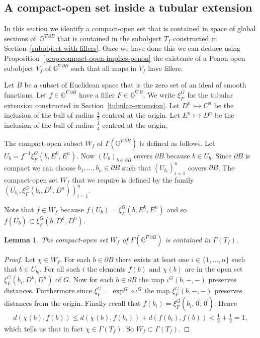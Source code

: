 \documentclass[pdftex]{sigma}
\numberwithin{equation}{section}
\newtheorem{Lemma}[Theorem]{Lemma}
\begin{document}
\subsection{A compact-open set inside a tubular extension}\label{sec:compact-open-in-tubular}

In this section we identify a compact-open set that is contained in space of global sections of~$\mathbb{G}^{\nabla\partial B}$ that is contained in the subobject $T_f$ constructed in Section~\ref{subobject-with-fillers}. Once we have done this we can deduce using Proposition~\ref{prop:compact-open-implies-penon} the existence of a Penon open subobject $V_f$ of $\mathbb{G}^{\nabla\partial B}$ such that all maps in $V_f$ have f\/illers.

\begin{Notation} Let $B$ be a subset of Euclidean space that is the zero set of an ideal of smooth functions. Let $f\in \mathbb{G}^{\nabla\partial B}$ have a f\/iller $F\in \mathbb{G}^{\nabla B}$. We write $\xi^G_F$ for the tubular extension constructed in Section~\ref{tubular-extension}. Let $D^n \rightarrowtail C^n$ be the inclusion of the ball of radius $\frac{1}{2}$ centred at the origin. Let $E^n \rightarrowtail D^n$ be the inclusion of the ball of radius $\frac{1}{4}$ centred at the origin,
\end{Notation}

\begin{Definition}The compact-open subset $W_f$ of $\Gamma(\mathbb{G}^{\nabla\partial B})$ is def\/ined as follows. Let $U_b=f^{-1}\xi^G_F(b,E^k,E^n)$. Now $(U_b)_{b\in \partial B}$ covers $\partial B$ because $b\in U_b$. Since $\partial B$ is compact we can choose $b_1,\dots ,b_n\in \partial B$ such that $(U_{b_i})_{i=1}^n$ covers $\partial B$. The compact-open set $W_f$ that we require is def\/ined by the family $(\overline{U_{b_i}},\xi^G_F(b_i,D^k,D^n))_{i=1}^n$.
\end{Definition}

\begin{Remark}Note that $f\in W_f$ because $f(U_b) = \xi^G_F(b,E^k,E^n)$ and so $f(\overline{U_b}) \subset \xi^G_F(b,D^k,D^n)$.
\end{Remark}

\begin{Lemma} The compact-open set $W_f$ of $\Gamma(\mathbb{G}^{\nabla\partial B})$ is contained in $\Gamma(T_f)$.
\end{Lemma}
 \begin{proof}Let $\chi\in W_f$. For each $b\in \partial B$ there exists at least one $i\in\{1,\dots ,n\}$ such that $b\in U_{b_i}$. For all such $i$ the elements $f(b)$ and $\chi(b)$ are in the open set $\xi^G_F(b_i,D^k,D^n)$ of $G$. Now for each $b\in\partial B$ the map $\iota^G(b,-,-)$ preserves distances. Furthermore since $\xi^G_F=\exp^G\circ \iota^G$ the map $\xi^G_F(b,-,-)$ preserves distances from the origin. Finally recall that $f(b_i)=\xi^G_F(b_i,\vec{0},\vec{0})$. Hence
 \begin{gather*}d(\chi(b),f(b))\leq d(\chi(b),f(b_i))+d(f(b_i),f(b))<\tfrac{1}{2}+\tfrac{1}{2}=1,\end{gather*}
 which tells us that in fact $\chi\in \Gamma(T_f)$.
 So $W_f\subset \Gamma(T_f)$.
 \end{proof}
\end{document}
